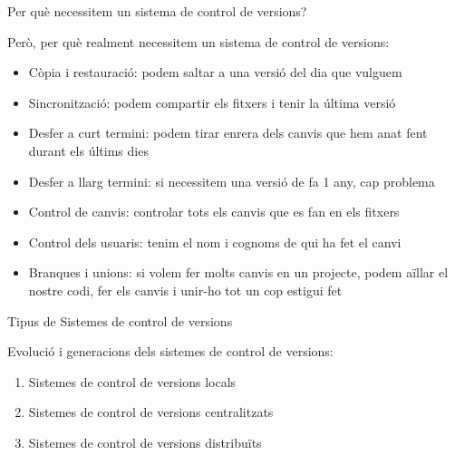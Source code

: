 \documentclass[10pt,xcolor={rgb}]{beamer}
\begin{document}
    \begin{frame}[fragile]{Per què necessitem un sistema de control de versions?}
      
      \begin{block}{Però, per què realment necessitem un sistema de control de versions:}
            
            \begin{itemize}
              \item Còpia i restauració:  podem saltar a una versió del dia que vulguem
              \item Sincronització: podem compartir els fitxers i tenir la última versió
              \item Desfer a curt termini:  podem tirar enrera dels canvis que hem anat fent durant els últims dies
              \item Desfer a llarg termini:  si necessitem una versió de fa 1 any, cap problema
              \item Control de canvis:  controlar tots els canvis que es fan en els fitxers 
              \item Control dels usuaris:  tenim el nom i cognoms de qui ha fet el canvi
              \item Branques i unions:  si volem fer molts canvis en un projecte, podem aïllar el nostre codi, fer els canvis i unir-ho tot un cop estigui fet
            \end{itemize}

      \end{block}

    \end{frame}

    \begin{frame}[fragile]{Tipus de Sistemes de control de versions}
      
            
      \begin{block}{Evolució i generacions dels sistemes de control de versions:}
        
        \begin{enumerate}
          \item Sistemes de control de versions locals
          \item Sistemes de control de versions centralitzats
          \item Sistemes de control de versions distribuïts
        \end{enumerate}

      \end{block}

    \end{frame}
      
\end{document}
